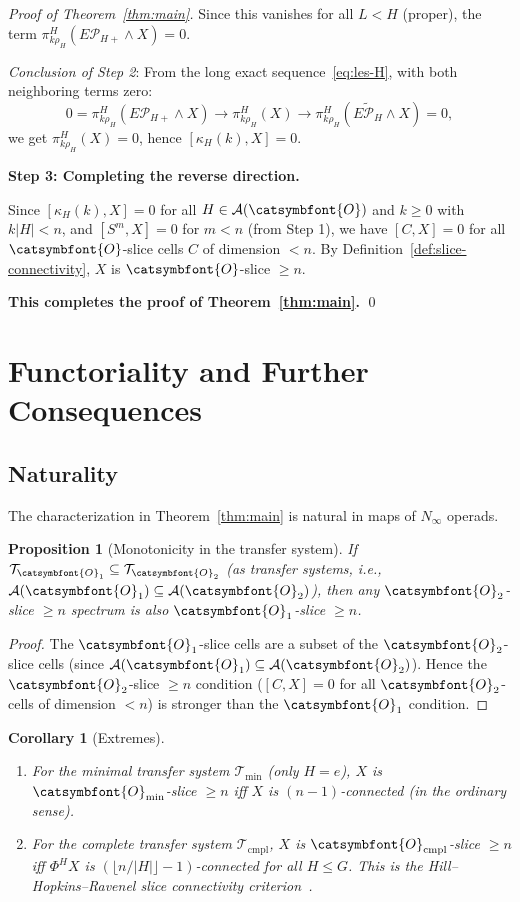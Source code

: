 \documentclass[12pt]{article}
\newcommand{\aO}{{\catsymbfont{O}}}
\newcommand{\aT}{{\mathcal{T}}}
\newtheorem{proposition}[theorem]{Proposition}
\newtheorem{corollary}[theorem]{Corollary}
\theoremstyle{definition}
\begin{document}
\begin{proof}[Proof of Theorem~\ref{thm:main}]
Since this vanishes for all $L < H$ (proper), the term $\pi_{k\rho_H}^H(E\mathcal{P}_{H+}\wedge X) = 0$.

\noindent\emph{Conclusion of Step 2}: From the long exact sequence~\eqref{eq:les-H}, with both neighboring terms zero:
\[
   0 = \pi_{k\rho_H}^H(E\mathcal{P}_{H+}\wedge X) \to \pi_{k\rho_H}^H(X) \to \pi_{k\rho_H}^H(\widetilde{E\mathcal{P}_H}\wedge X) = 0,
\]
we get $\pi_{k\rho_H}^H(X) = 0$, hence $[\kappa_H(k), X] = 0$.

\medskip
\noindent\textbf{Step 3: Completing the reverse direction.}

Since $[\kappa_H(k), X] = 0$ for all $H\in\mathcal{A}(\aO)$ and $k\geq 0$ with $k|H| < n$, and $[S^m, X] = 0$ for $m < n$ (from Step 1), we have $[C, X] = 0$ for all $\aO$-slice cells $C$ of dimension $< n$.  By Definition~\ref{def:slice-connectivity}, $X$ is $\aO$-slice $\geq n$.

\bigskip
\noindent\textbf{This completes the proof of Theorem~\ref{thm:main}.} \qed
\end{proof}

\section{Functoriality and Further Consequences}

\subsection{Naturality}

The characterization in Theorem~\ref{thm:main} is natural in maps of $N_\infty$ operads.

\begin{proposition}[Monotonicity in the transfer system]\label{prop:monotone}
If $\aT_{\aO_1} \subseteq \aT_{\aO_2}$ (as transfer systems, i.e., $\mathcal{A}(\aO_1) \subseteq \mathcal{A}(\aO_2)$), then any $\aO_2$-slice $\geq n$ spectrum is also $\aO_1$-slice $\geq n$.
\end{proposition}
\begin{proof}
The $\aO_1$-slice cells are a subset of the $\aO_2$-slice cells (since $\mathcal{A}(\aO_1)\subseteq\mathcal{A}(\aO_2)$).  Hence the $\aO_2$-slice $\geq n$ condition ($[C,X]=0$ for all $\aO_2$-cells of dimension $<n$) is stronger than the $\aO_1$ condition.
\end{proof}

\begin{corollary}[Extremes]\label{cor:extremes}
\begin{enumerate}[label=(\alph*)]
\item For the minimal transfer system $\aT_{\mathrm{min}}$ (only $H=e$), $X$ is $\aO_{\min}$-slice $\geq n$ iff $X$ is $(n-1)$-connected (in the ordinary sense).
\item For the complete transfer system $\aT_{\mathrm{cmpl}}$, $X$ is $\aO_{\mathrm{cmpl}}$-slice $\geq n$ iff $\Phi^H X$ is $(\lfloor n/|H|\rfloor - 1)$-connected for all $H\leq G$.  This is the Hill--Hopkins--Ravenel slice connectivity criterion~\cite[Prop.~4.28]{HHR}.
\end{enumerate}
\end{corollary}
\end{document}
